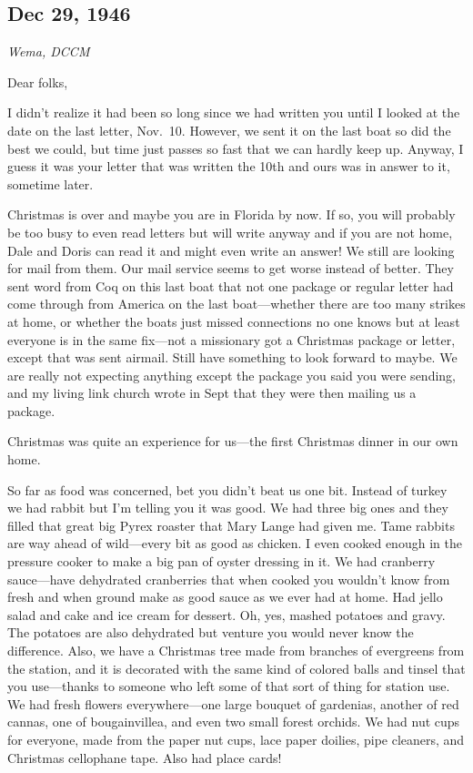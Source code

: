 \documentclass[
]{book}
\begin{document}
\hypertarget{dec-29-1946}{%
\subsection{Dec 29, 1946}\label{dec-29-1946}}

\emph{Wema, DCCM}

Dear folks,

I didn't realize it had been so long since we had written you until I looked at the date on the last letter, Nov.~10. However, we sent it on the last boat so did the best we could, but time just passes so fast that we can hardly keep up. Anyway, I guess it was your letter that was written the 10th and ours was in answer to it, sometime later.

Christmas is over and maybe you are in Florida by now. If so, you will probably be too busy to even read letters but will write anyway and if you are not home, Dale and Doris can read it and might even write an answer! We still are looking for mail from them. Our mail service seems to get worse instead of better. They sent word from Coq on this last boat that not one package or regular letter had come through from America on the last boat---whether there are too many strikes at home, or whether the boats just missed connections no one knows but at least everyone is in the same fix---not a missionary got a Christmas package or letter, except that was sent airmail. Still have something to look forward to maybe. We are really not expecting anything except the package you said you were sending, and my living link church wrote in Sept that they were then mailing us a package.

Christmas was quite an experience for us---the first Christmas dinner in our own home.

So far as food was concerned, bet you didn't beat us one bit. Instead of turkey we had rabbit but I'm telling you it was good. We had three big ones and they filled that great big Pyrex roaster that Mary Lange had given me. Tame rabbits are way ahead of wild---every bit as good as chicken. I even cooked enough in the pressure cooker to make a big pan of oyster dressing in it. We had cranberry sauce---have dehydrated cranberries that when cooked you wouldn't know from fresh and when ground make as good sauce as we ever had at home. Had jello salad and cake and ice cream for dessert. Oh, yes, mashed potatoes and gravy. The potatoes are also dehydrated but venture you would never know the difference. Also, we have a Christmas tree made from branches of evergreens from the station, and it is decorated with the same kind of colored balls and tinsel that you use---thanks to someone who left some of that sort of thing for station use. We had fresh flowers everywhere---one large bouquet of gardenias, another of red cannas, one of bougainvillea, and even two small forest orchids. We had nut cups for everyone, made from the paper nut cups, lace paper doilies, pipe cleaners, and Christmas cellophane tape. Also had place cards!
\end{document}

